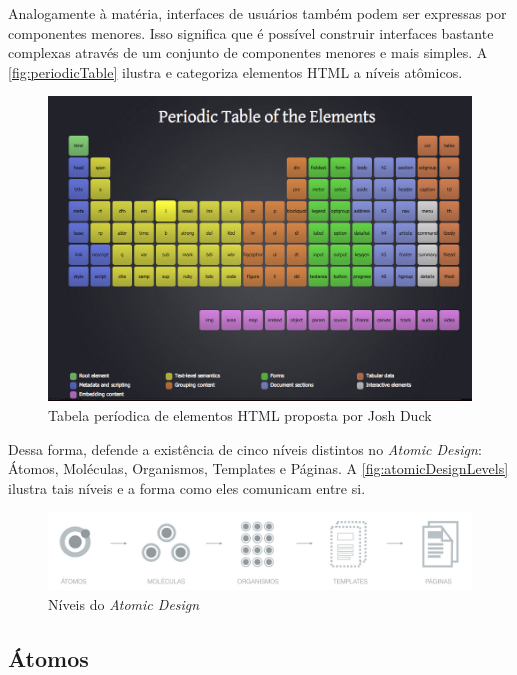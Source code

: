 Analogamente à matéria, interfaces de usuários também podem ser expressas por componentes menores. Isso significa que é possível construir interfaces bastante complexas através de um conjunto de componentes menores e mais simples. A \autoref{fig:periodicTable} ilustra e categoriza elementos HTML a níveis atômicos.

\begin{figure}
	\includegraphics[width=\linewidth]{./04-figuras/02_referencial_teorico/periodic-table.png}
	\caption{Tabela períodica de elementos HTML proposta por Josh Duck}
  \label{fig:periodicTable}
\end{figure}

Dessa forma,  defende a existência de cinco níveis distintos no \textit{Atomic Design}: Átomos, Moléculas, Organismos, Templates e Páginas. A \autoref{fig:atomicDesignLevels} ilustra tais níveis e a forma como eles comunicam entre si.

\begin{figure}
	\includegraphics[width=\linewidth]{./04-figuras/02_referencial_teorico/atomic-levels.png}
	\caption{Níveis do \textit{Atomic Design}}
  \label{fig:atomicDesignLevels}
\end{figure}

\subsection{Átomos}
\label{subsec:atomos}

